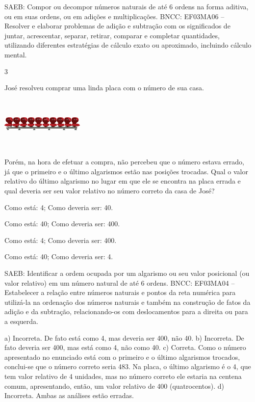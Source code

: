 {\begin{escolha}
{SAEB: Compor ou decompor números naturais de até 6 ordens na
forma aditiva, ou em suas ordens, ou em adições e multiplicações.
BNCC: EF03MA06 – Resolver e elaborar problemas de adição e subtração com os significados de
juntar, acrescentar, separar, retirar, comparar e completar quantidades, utilizando diferentes
estratégias de cálculo exato ou aproximado, incluindo cálculo mental.


\num{3}

José resolveu comprar uma linda placa com o número de sua casa.

\includegraphics[width=1.60256in,height=1.03072in]{media/image107.png}


Porém, na hora de efetuar a compra, não percebeu que o número estava errado, já que o primeiro e o último algarismos estão nas posições
trocadas. Qual o valor relativo do último algarismo no lugar em que ele se
encontra na placa errada e qual deveria ser seu valor relativo no número correto da casa de José?

\begin{escolha}
\item
  Como está: 4; Como deveria ser: 40.
\item
  Como está: 40; Como deveria ser: 400.
\item
  Como está: 4; Como deveria ser: 400.
\item
  Como está: 40; Como deveria ser: 4.
\end{escolha}

SAEB: Identificar a ordem ocupada por um algarismo ou seu
valor posicional (ou valor relativo) em um número natural de até 6
ordens.
BNCC: EF03MA04 -- Estabelecer a relação entre números naturais e pontos da reta numérica para
utilizá-la na ordenação dos números naturais e também na construção de fatos da adição e da
subtração, relacionando-os com deslocamentos para a direita ou para a esquerda.

a) Incorreta. De fato está como 4, mas deveria ser 400, não 40.
b) Incorreta. De fato deveria ser 400, mas está como 4, não como 40.
c) Correta. Como o número apresentado no enunciado está com o primeiro e o último
algarismos trocados, conclui-se que o número correto seria 483. Na placa,
o último algarismo é o 4, que tem valor relativo de 4 unidades, mas no
número correto ele estaria na centena comum, apresentando, então, um valor
relativo de 400 (quatrocentos).
d) Incorreta. Ambas as análises estão erradas.

}
\end{escolha}}
